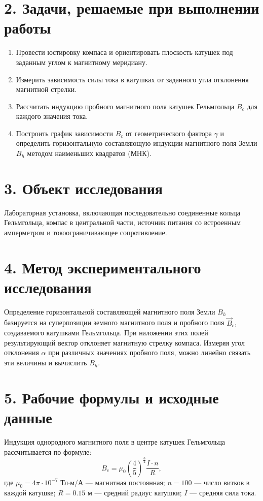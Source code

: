 \documentclass[a4paper,12pt]{article}
\begin{document}
\section*{\hspace{30pt}2. Задачи, решаемые при выполнении работы}
\begin{enumerate}
    \setlength{\itemindent}{15pt}
    \item Провести юстировку компаса и ориентировать плоскость катушек под заданным углом к магнитному меридиану.
    \item Измерить зависимость силы тока в катушках от заданного угла отклонения магнитной стрелки.
    \item Рассчитать индукцию пробного магнитного поля катушек Гельмгольца $B_c$ для каждого значения тока.
    \item Построить график зависимости $B_c$ от геометрического фактора $\gamma$ и определить горизонтальную составляющую индукции магнитного поля Земли $B_h$ методом наименьших квадратов (МНК).
\end{enumerate}

\section*{\hspace{30pt}3. Объект исследования}
\hspace{15pt} Лабораторная установка, включающая последовательно соединенные кольца Гельмгольца, компас в центральной части, источник питания со встроенным амперметром и токоограничивающее сопротивление.

\section*{\hspace{30pt}4. Метод экспериментального исследования}
\hspace{15pt} Определение горизонтальной составляющей магнитного поля Земли $B_h$ базируется на суперпозиции земного магнитного поля и пробного поля $\vec{B}_c$, создаваемого катушками Гельмгольца. При наложении этих полей результирующий вектор отклоняет магнитную стрелку компаса. Измеряя угол отклонения $\alpha$ при различных значениях пробного поля, можно линейно связать эти величины и вычислить $B_h$.

\section*{\hspace{30pt}5. Рабочие формулы и исходные данные}
\hspace{15pt} Индукция однородного магнитного поля в центре катушек Гельмгольца рассчитывается по формуле:
\begin{equation}
    B_c = \mu_0 \left(\frac{4}{5}\right)^{\frac{3}{2}} \frac{I \cdot n}{R},
    \label{eq:bc_field}
\end{equation}
где $\mu_0 = 4\pi \cdot 10^{-7}$ Тл$\cdot$м/А — магнитная постоянная; $n = 100$ — число витков в каждой катушке; $R = 0.15$ м — средний радиус катушки; $I$ — средняя сила тока.
\end{document}
